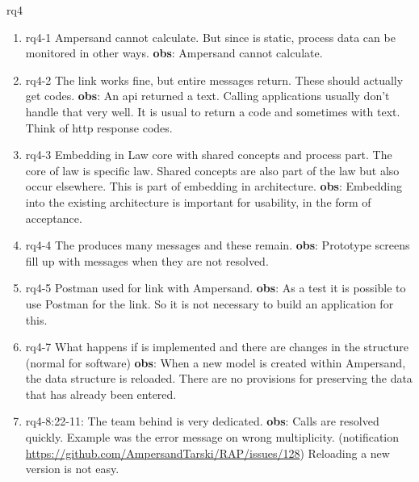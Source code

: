 \def\rq{rq4}

\acrlong{\rq}

\begin{enumerate}
    \item rq4-1 Ampersand cannot calculate.
    But since  is static, process data can be monitored in other ways.
    \newline\textbf{obs}: Ampersand cannot calculate.
    
    \item rq4-2 The  link works fine, but entire messages return.
    These should actually get codes.
    \newline\textbf{obs}: An api returned a text.
    Calling applications usually don't handle that very well.
    It is usual to return a code and sometimes with text.
    Think of http response codes.
    
    \item rq4-3 Embedding in 
     Law core with shared concepts and process part.
     The core of law is specific law.
     Shared concepts are also part of the law but also occur elsewhere.
     This is part of embedding in architecture.
     \newline\textbf{obs}: Embedding into the existing architecture is important for usability, in the form of acceptance.
    
    \item rq4-4 The  produces many messages and these remain.
    \newline\textbf{obs}: Prototype screens fill up with messages when they are not resolved.
    
    \item rq4-5 Postman used for  link with Ampersand.
    \newline\textbf{obs}: As a test it is possible to use Postman for the link.
    So it is not necessary to build an application for this.
    
    \item rq4-7 What happens if  is implemented and there are changes in the structure (normal for software)
    \newline\textbf{obs}: When a new model is created within Ampersand, the data structure is reloaded.
    There are no provisions for preserving the data that has already been entered.

    \item rq4-8:22-11: The team behind  is very dedicated.
    \newline\textbf{obs}: Calls are resolved quickly.
    Example was the error message on wrong multiplicity.
    (notification \url{https://github.com/AmpersandTarski/RAP/issues/128})
    Reloading a new version is not easy.
    
    
\end{enumerate}


\newpage
